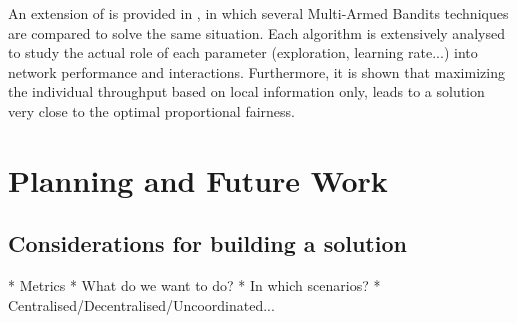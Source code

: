 \documentclass[12pt, a4paper,twoside]{tesi_upf}
\begin{document}
			An extension of \cite{wilhelmi2017implications} is provided in \cite{wilhelmi2017enhancing}, in which several Multi-Armed Bandits techniques are compared to solve the same situation. Each algorithm is extensively analysed to study the actual role of each parameter (exploration, learning rate...) into network performance and interactions. Furthermore, it is shown that maximizing the individual throughput based on local information only, leads to a solution very close to the optimal proportional fairness.				

	\chapter{Planning and Future Work}
	\label{section:future_work}

		\section{Considerations for building a solution}
		\label{section:considerations}
			* Metrics
			* What do we want to do?
			* In which scenarios?
			* Centralised/Decentralised/Uncoordinated...
\end{document}
